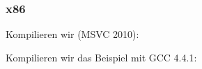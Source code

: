 \subsubsection{x86}


Kompilieren wir (MSVC 2010):






Kompilieren wir das Beispiel mit GCC 4.4.1:



